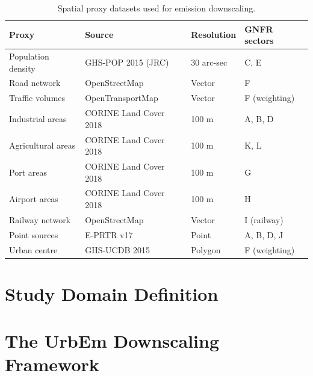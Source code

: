 \begin{table}[h]
  \centering
  \caption{Spatial proxy datasets used for emission downscaling.}
  \label{tab:proxies}
  \begin{tabular}{llll}
    \toprule
    \textbf{Proxy} & \textbf{Source} & \textbf{Resolution} & \textbf{GNFR sectors} \\
    \midrule
    Population density    & GHS-POP 2015 (JRC)   & 30 arc-sec & C, E \\
    Road network          & OpenStreetMap        & Vector     & F \\
    Traffic volumes       & OpenTransportMap     & Vector     & F (weighting) \\
    Industrial areas      & CORINE Land Cover 2018 & 100 m   & A, B, D \\
    Agricultural areas    & CORINE Land Cover 2018 & 100 m   & K, L \\
    Port areas            & CORINE Land Cover 2018 & 100 m   & G \\
    Airport areas         & CORINE Land Cover 2018 & 100 m   & H \\
    Railway network       & OpenStreetMap        & Vector     & I (railway) \\
    Point sources         & E-PRTR v17           & Point      & A, B, D, J \\
    Urban centre          & GHS-UCDB 2015        & Polygon    & F (weighting) \\
    \bottomrule
  \end{tabular}
\end{table}


\section{Study Domain Definition}
\label{sec:data_domain}


\section{The UrbEm Downscaling Framework}
\label{sec:methods_urbem}


